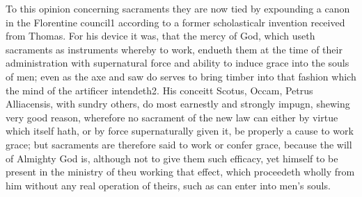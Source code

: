 To this opinion concerning sacraments they are now tied by expounding a canon in the Florentine council1 according to a former scholasticalr invention received from Thomas. For his device it was, that the mercy of God, which useth sacraments as instruments whereby to work, endueth them at the time of their administration with supernatural force and ability to induce grace into the souls of men; even as the axe and saw do serves to bring timber into that fashion which the mind of the artificer intendeth2. His conceitt  Scotus, Occam, Petrus Alliacensis, with sundry others, do most earnestly and strongly impugn, shewing very good reason, wherefore no sacrament of the new law can either by virtue which itself hath, or by force supernaturally given it, be properly a cause to work grace; but sacraments are therefore said to work or confer grace, because the will of Almighty God is, although not to give them such efficacy, yet himself to be present in the ministry of theu working that effect, which proceedeth wholly from him without any real operation of theirs, such as can enter into men’s souls.

